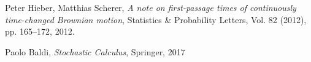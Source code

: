 \documentclass[12pt]{article}
\theoremstyle{break}
\begin{document}
\begin{thebibliography}{9}
	
	Peter Hieber, Matthias Scherer,
	\textit{A note on first-passage times of continuously time-changed Brownian motion},
	Statistics \& Probability Letters, Vol. 82 (2012), pp. 165–172,
	2012.
	
	Paolo Baldi,
	\textit{Stochastic Calculus},
	Springer, 2017

\end{thebibliography}
\end{document}
